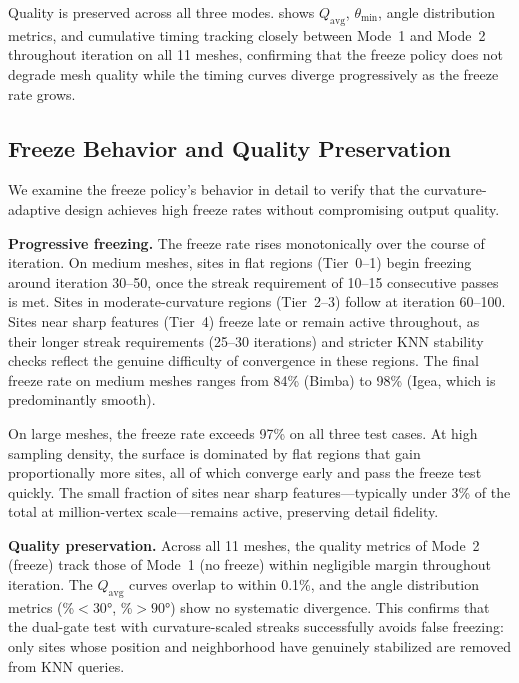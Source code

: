 Quality is preserved across all three modes.  shows $Q_{\mathrm{avg}}$, $\theta_{\min}$, angle distribution metrics, and cumulative timing tracking closely between Mode~1 and Mode~2 throughout iteration on all 11 meshes, confirming that the freeze policy does not degrade mesh quality while the timing curves diverge progressively as the freeze rate grows.

\subsection{Freeze Behavior and Quality Preservation}
\label{sec:freeze_behavior}

We examine the freeze policy's behavior in detail to verify that the curvature-adaptive design achieves high freeze rates without compromising output quality.

\textbf{Progressive freezing.}
The freeze rate rises monotonically over the course of iteration. On medium meshes, sites in flat regions (Tier~0--1) begin freezing around iteration 30--50, once the streak requirement of 10--15 consecutive passes is met. Sites in moderate-curvature regions (Tier~2--3) follow at iteration 60--100. Sites near sharp features (Tier~4) freeze late or remain active throughout, as their longer streak requirements (25--30 iterations) and stricter KNN stability checks reflect the genuine difficulty of convergence in these regions. The final freeze rate on medium meshes ranges from 84\% (Bimba) to 98\% (Igea, which is predominantly smooth).

On large meshes, the freeze rate exceeds 97\% on all three test cases. At high sampling density, the surface is dominated by flat regions that gain proportionally more sites, all of which converge early and pass the freeze test quickly. The small fraction of sites near sharp features---typically under 3\% of the total at million-vertex scale---remains active, preserving detail fidelity.

\textbf{Quality preservation.}
Across all 11 meshes, the quality metrics of Mode~2 (freeze) track those of Mode~1 (no freeze) within negligible margin throughout iteration. The $Q_{\mathrm{avg}}$ curves overlap to within 0.1\%, and the angle distribution metrics (\%$< 30°$, \%$> 90°$) show no systematic divergence. This confirms that the dual-gate test with curvature-scaled streaks successfully avoids false freezing: only sites whose position and neighborhood have genuinely stabilized are removed from KNN queries.

